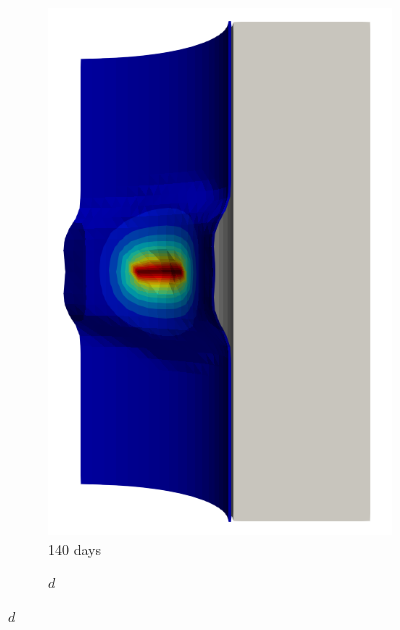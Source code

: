 \begin{figure}[!htb]
\begin{subfigure}[b]{0.2\textwidth}
    \includegraphics[width=\textwidth]{Chapter5/figures/spallation/seed_d_4}
    \caption{140 days}
  \end{subfigure}
  \begin{subfigure}[b]{0.1\textwidth}
    \centering
    \caption*{$d$}

\end{subfigure}
\end{figure}
